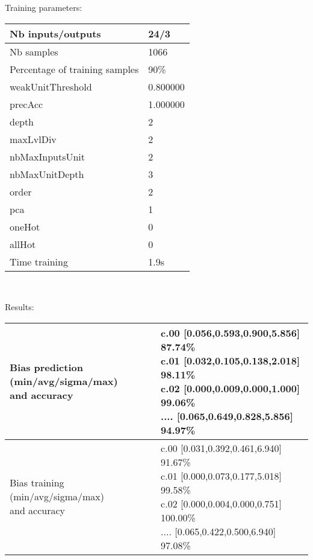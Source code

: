 Training parameters:\\
\begin{center}
\begin{tabular}{|l|l|}
\hline
Nb inputs/outputs&24/3\\
\hline
Nb samples&1066\\
\hline
Percentage of training samples&90\%\\
\hline
weakUnitThreshold&0.800000\\
\hline
precAcc&1.000000\\
\hline
depth&2\\
\hline
maxLvlDiv&2\\
\hline
nbMaxInputsUnit&2\\
\hline
nbMaxUnitDepth&3\\
\hline
order&2\\
\hline
pca&1\\
\hline
oneHot&0\\
\hline
allHot&0\\
\hline
Time training&1.9s\\
\hline
\end{tabular}\\
\end{center}\newline
Results:
\begin{center}
\begin{tabular}{|l|l|}
\hline
\makecell{Bias prediction (min/avg/sigma/max)\\and accuracy}&\makecell{c.00 [0.056,0.593,0.900,5.856] 87.74\%\\
c.01 [0.032,0.105,0.138,2.018] 98.11\%\\
c.02 [0.000,0.009,0.000,1.000] 99.06\%\\
.... [0.065,0.649,0.828,5.856] 94.97\%\\
}\\

\hline
\makecell{Bias training (min/avg/sigma/max)\\and accuracy}&\makecell{c.00 [0.031,0.392,0.461,6.940] 91.67\%\\
c.01 [0.000,0.073,0.177,5.018] 99.58\%\\
c.02 [0.000,0.004,0.000,0.751] 100.00\%\\
.... [0.065,0.422,0.500,6.940] 97.08\%\\
}\\
\hline
\end{tabular}\
\end{center}
